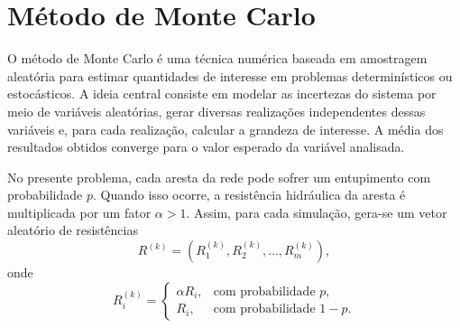 \documentclass{article}
\begin{document}

 



\section{Método de Monte Carlo}

O método de Monte Carlo é uma técnica numérica baseada em amostragem aleatória para estimar quantidades de interesse em problemas determinísticos ou estocásticos. A ideia central consiste em modelar as incertezas do sistema por meio de variáveis aleatórias, gerar diversas realizações independentes dessas variáveis e, para cada realização, calcular a grandeza de interesse. A média dos resultados obtidos converge para o valor esperado da variável analisada.

No presente problema, cada aresta da rede pode sofrer um entupimento com probabilidade \(p\). Quando isso ocorre, a resistência hidráulica da aresta é multiplicada por um fator \(\alpha > 1\). Assim, para cada simulação, gera-se um vetor aleatório de resistências
\[
R^{(k)} = \left(R_1^{(k)}, R_2^{(k)}, \dots, R_m^{(k)}\right),
\]
onde
\[
R_i^{(k)} =
\begin{cases}
\alpha R_i, & \text{com probabilidade } p,\\
R_i, & \text{com probabilidade } 1-p.
\end{cases}
\]
\end{document}
